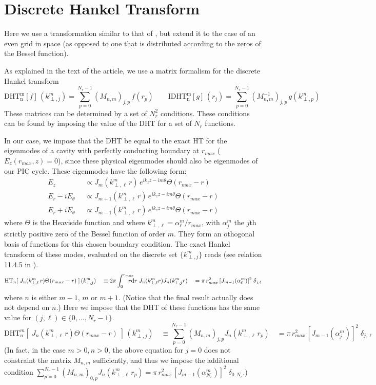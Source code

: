 \section{Discrete Hankel Transform}
\label{sec:HTMatrix}

Here we use a transformation similar to that of \cite{Yu,Guizar,KaiMing}, but
extend it to the case of an even grid in space (as opposed to one
that is distributed according to the zeros of the Bessel function).

As explained in the text of the article, we use a matrix formalism for
the discrete Hankel transform
\[ \mathrm{DHT^m_n}[f] \,(k^m_{\perp,j}) = \sum_{p=0}^{N_r-1} (M_{n,m})_{j,p}
\,f(r_p) \qquad \mathrm{IDHT^m_n}[g] \, (r_j) = \sum_{p=0}^{N_r-1}
(M^{-1}_{n,m})_{j,p} \,g(k^m_{\perp,p}) \]
These matrices can be determined by a set of $N_r^2$ conditions. These
conditions can be found by imposing the value of the DHT for a set of  $N_r$ functions.

In our case, we impose that the DHT be equal to the exact HT for the eigenmodes of a cavity with
perfectly conducting boundary at $r_{max}$ ($E_z(r_{max},z) =
0$), since these physical eigenmodes should also be eigenmodes of our
PIC cycle. These eigenmodes have the following form:
\begin{align*}
E_z \;& \; \propto  J_m(k^m_{\perp,\ell} \,r)\,e^{ik_z z -im\theta} \Theta(r_{max}-r) \\
E_r -i E_\theta \;& \; \propto  J_{m+1}(k^m_{\perp,\ell} \,r) \,e^{ik_z z -im\theta} \Theta(r_{max}-r)\\
E_r +i E_\theta \;& \; \propto  J_{m-1}(k^m_{\perp,\ell} \,r)
                    \,e^{ik_z z -im\theta} \Theta(r_{max}-r) 
\end{align*}
where $\Theta$ is the Heaviside function and where $k^m_{\perp,\ell} =
\alpha^m_\ell / r_{max}$, with $\alpha^m_j$ the $j$th strictly positive zero of
the Bessel function of order $m$. They form an othogonal basis of
functions for this chosen boundary condition. The exact Hankel transform of these modes, evaluated on the discrete set $\{
k^m_{\perp,j} \}$ reads (see relation 11.4.5 in \cite{Abramowitz}).
\[
\mathrm{HT}_{n}[ \; J_n(k^m_{\perp,\ell} \,r)  \Theta(r_{max}-r)  \;] \,(k^m_{\perp,j} )
\quad \equiv 2\pi \rInteg \; J_n (k^m_{\perp,\ell} r) J_n (k^m_{\perp,j} r)
\quad = \pi\, r_{max}^2\,[ J_{m-1}(\alpha_\ell^m)]^2 \; \delta_{j,\ell} \]
where $n$ is either $m-1$, $m$ or $m+1$. (Notice that the final
result actually does not depend on $n$.) Here we impose that the DHT of these functions has the same value for $(j,\ell) \in \{ 0,..., N_r - 1\}$.
\[
\mathrm{DHT}^m_{n}[ \; J_n(k^m_{\perp,\ell} \,r) \Theta(r_{max}-r)  \;] \,(k^m_{\perp,j}) 
\quad \equiv \sum_{p=0}^{N_r-1} (M_{n,m})_{j,p}
  J_n(k^m_{\perp,\ell}\,r_p) 
\quad = \pi\, r_{max}^2\,[ J_{m-1}(\alpha_j^m)]^2 \; \delta_{j,\ell} 
\]
(In fact, in the case $m>0, n>0$, the above equation for $j=0$ does not
constraint the matrix $M_{n,m}$ sufficiently, and thus we impose the additional
condition $\sum_{p=0}^{N_r-1} (M_{n,m})_{0,p}  J_n(k^m_{\perp,\ell}\,r_p) = \pi\, r_{max}^2\,[ J_{m-1}(\alpha_{N_r}^m)]^2 \; \delta_{0,N_r}$.)

